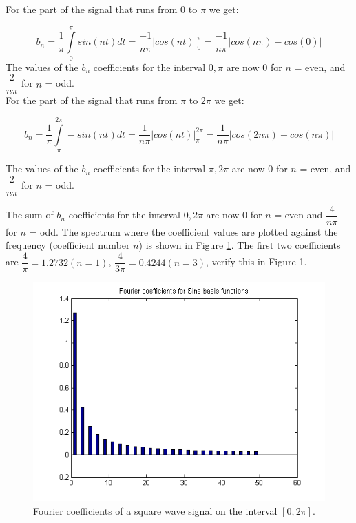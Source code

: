 \documentclass[11pt,letterpaper]{article}
\begin{document}
For the part of the signal that runs from $0$ to $\pi$ we get:

\begin{equation}\label{HW_FourierSeries4}
b_n = \dfrac{1}{\pi} \int \limits_{0}^{\pi} sin(nt) dt =  \dfrac{-1}{n\pi} \left| cos(nt) \right|_0^\pi = \dfrac{-1}{n\pi}\left| cos(n\pi) -cos(0) \right|
\end{equation}
The values of the $b_n$ coefficients for the interval $0, \pi$ are now $0$ for $n$ = even, and $\dfrac{2}{n \pi}$ for $n$ = odd.\\

For the part of the signal that runs from $\pi$ to $2 \pi$ we get:

\begin{equation}\label{HW_FourierSeries5}
b_n = \dfrac{1}{\pi} \int \limits_{\pi}^{2 \pi} -sin(nt) dt =  \dfrac{1}{n\pi} \left| cos(nt) \right|_\pi ^{2\pi} = \dfrac{1}{n\pi}\left| cos(2n\pi) -cos(n\pi) \right|
\end{equation}

The values of the $b_n$ coefficients for the interval $\pi, 2 \pi$ are now $0$ for $n$ = even, and $\dfrac{2}{n \pi}$ for $n$ = odd. 

The sum of $b_n$ coefficients for the interval $0, 2 \pi$ are now $0$ for $n$ = even and $\dfrac{4}{n \pi}$ for $n$ = odd. The spectrum where the coefficient values are plotted against the frequency (coefficient number $n$) is shown in Figure \ref{fig:HW_FourierSeries2}. The first two coefficients are $\dfrac{4}{\pi} = 1.2732 (n=1)$, $\dfrac{4}{3 \pi} = 0.4244 (n=3)$, verify this in Figure \ref{fig:HW_FourierSeries2}.\\

\begin{figure}
\centering
\includegraphics[width=0.7\linewidth]{HW_FourierSeries2}
\caption{Fourier coefficients of a square wave signal on the interval $[0, 2 \pi]$.}
\label{fig:HW_FourierSeries2}
\end{figure}
\end{document}
